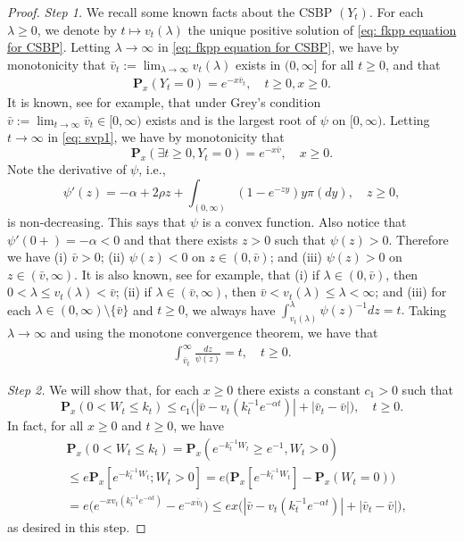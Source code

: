 \documentclass[12pt,a4paper]{amsart}
\theoremstyle{plain}
\theoremstyle{definition}
\numberwithin{equation}{section}
\begin{document}
\begin{proof}
  \emph{Step 1.}
  We recall some known facts about the CSBP $(Y_t)$.
  For each $\lambda \geq 0$, we denote by $t\mapsto v_t(\lambda)$ the unique positive solution of \eqref{eq: fkpp equation for CSBP}.
  Letting $\lambda \to \infty$ in \eqref{eq: fkpp equation for CSBP}, we have by monotonicity that $\bar v_t:= \lim_{\lambda \to \infty}v_t(\lambda)$ exists in $(0,\infty]$ for all $t\geq 0$, and that
  \begin{align}
    \label{eq: svp1}
    \mathbf P_x(Y_t = 0)=e^{-x\bar v_t}, \quad t\geq 0, x\ge 0.
  \end{align}
  It is known, see \cite[Theorems 3.5--3.8]{Li2011Measure-valued} for example, that under Grey's condition $\bar v:= \lim_{t\to \infty} \bar v_t \in [0,\infty)$ exists and is the largest root of $\psi$ on $[0,\infty)$.
  Letting $t \to \infty$ in \eqref{eq: svp1}, we have by monotonicity that
  \[
    \mathbf P_x(\exists t \geq 0, Y_t = 0)
    = e^{-x\bar v}, \quad x\geq 0.
  \]
 Note the derivative of $\psi$, i.e.,
  \[
    \psi'(z)
    = -\alpha + 2\rho z + \int_{(0,\infty)}(1-e^{-zy})y\pi(dy),\quad z\geq 0,
  \]
  is non-decreasing.
  This says that $\psi$ is a convex function.
  Also notice that $\psi'(0+)=-\alpha <0$ and that there exists $z>0$ such that $\psi(z)>0$.
  Therefore we have (i) $\bar v > 0$; (ii) $\psi(z) < 0$ on $z\in (0,\bar v)$; and (iii) $\psi(z) > 0 $ on $z\in (\bar v, \infty)$.
  It is also known, see \cite[Proposition 3.3]{Li2011Measure-valued} for example, that (i) if $\lambda \in (0,\bar v)$, then $0<\lambda \leq v_t(\lambda)<\bar v $; (ii) if $\lambda \in (\bar v, \infty)$, then $\bar v < v_t(\lambda)\leq \lambda< \infty$; and (iii) for each $\lambda \in (0,\infty)\setminus \{\bar v\}$ and $t\geq 0$, we always have
    \(
      \int_{v_t(\lambda)}^\lambda  \psi(z)^{-1}dz = t.
    \)
  Taking $\lambda \to \infty$ and using the monotone convergence theorem, we have that
  \begin{align}
    \label{eq:svp2}
    \int_{\bar v_t}^\infty \frac{dz}{\psi(z)} = t, \quad t\geq 0.
  \end{align}

  \emph{Step 2.} We will show that, for each $x \geq 0$ there exists a constant $c_1>0$ such that
  \[
    \mathbf P_{x}(0< W_t\leq k_t)
    \leq c_1\big(|\bar v- v_t(k_t^{-1}e^{-\alpha t})|+|\bar v_t - \bar v|\big),
    \quad t\geq 0.
  \]
  In fact, for all $x\geq 0$ and $t\geq 0$, we have
  \begin{align}
    & \mathbf P_{x}(0<W_t \leq k_t)
      = \mathbf P_{x}( e^{-k_t^{-1}W_t}\geq e^{-1},W_t > 0) \\
    & \leq e \mathbf P_{x}[e^{-k_t^{-1} W_t};W_t > 0]
      =  e\big(\mathbf P_x[e^{-k_t^{-1} W_t}]-\mathbf P_x(W_t = 0)\big) \\
    & = e\big(e^{-xv_t(k_t^{-1} e^{-\alpha t})}-e^{-x\bar v_t}\big)
      \leq ex \big(|\bar v-v_t(k_t^{-1} e^{-\alpha t})|+ |\bar v_t- \bar v|\big),
  \end{align}
  as desired in this step.


\end{proof}
\end{document}
